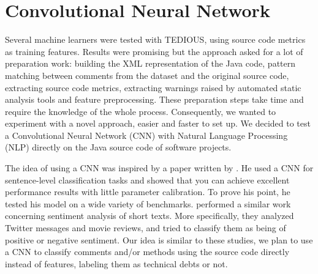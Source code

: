 \label{sec:Theme3}


%	
%

\section{Convolutional Neural Network}


Several machine learners were tested with TEDIOUS, using source code metrics as training features. Results were promising but the approach asked for a lot of preparation work: building the XML representation of the Java code, pattern matching between comments from the dataset and the original source code, extracting source code metrics, extracting warnings raised by automated static analysis tools and feature preprocessing. These preparation steps take time and require the knowledge of the whole process. Consequently, we wanted to experiment with a novel approach, easier and faster to set up. We decided to test a Convolutional Neural Network (CNN) with Natural Language Processing (NLP) directly on the Java source code of software projects.

The idea of using a CNN was inspired by a paper written by \citet{kim2014convolutional}. He used a CNN for sentence-level classification tasks and showed that you can achieve excellent performance results with little parameter calibration. To prove his point, he tested his model on a wide variety of benchmarks. \citet{dos2014deep} performed a similar work concerning sentiment analysis of short texts. More specifically, they analyzed Twitter messages and movie reviews, and tried to classify them as being of positive or negative sentiment. Our idea is similar to these studies, we plan to use a CNN to classify comments and/or methods using the source code directly instead of features, labeling them as technical debts or not.

